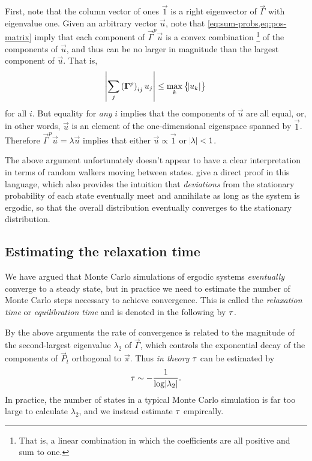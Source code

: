 First, note that the column vector of ones $\vec{1}$ is a right eigenvector of
$\vec{\Gamma}$ with eigenvalue one. Given an arbitrary vector $\vec{u}$, note
that \cref{eq:sum-probs,eq:pos-matrix} imply that each component of
$\vec{\Gamma}^p \vec{u}$ is a convex combination%
\footnote{%
  That is, a linear combination in which the coefficients are all positive and
  sum to one.
}
of the components of $\vec{u}$, and thus can be no larger in magnitude than the
largest component of $\vec{u}$. That is,
\begin{equation}
  \abs{\sum_j \del{\vec{\Gamma}^p}_{ij} u_j}
  \leq \max_k \cbr{\abs{u_k}}
\end{equation}
for all $i$. But equality for \emph{any} $i$ implies that the components of
$\vec{u}$ are all equal, or, in other words, $\vec{u}$ is an element of the
one-dimensional eigenspace spanned by $\vec{1}$. Therefore
$\vec{\Gamma}^p \vec{u} = \lambda\vec{u}$ implies that either $\vec{u} \propto \vec{1}$
or $\abs{\lambda}<1$.

The above argument unfortunately doesn't appear to have a clear interpretation
in terms of random walkers moving between states.
\textcite{narayan2001convergence} give a direct proof in this language, which
also provides the intuition that \emph{deviations} from the stationary
probability of each state eventually meet and annihilate as long as the system
is ergodic, so that the overall distribution eventually converges to the
stationary distribution.

\subsection{Estimating the relaxation time}
\label{sec:numerical-equilibration}

We have argued that Monte Carlo simulations of ergodic systems
\emph{eventually} converge to a steady state, but in practice we need to
estimate the number of Monte Carlo steps necessary to achieve convergence. This
is called the \emph{relaxation time} or \emph{equilibration time} and is
denoted in the following by $\tau$.

By the above arguments the rate of convergence is related to the magnitude of
the second-largest eigenvalue $\lambda_2$ of $\vec{\Gamma}$, which controls the
exponential decay of the components of $\vec{P}_t$ orthogonal to $\vec{\pi}$.
Thus \emph{in theory} $\tau$ can be estimated by
\begin{equation}
  \tau \sim -\frac{1}{\log{\abs{\lambda_2}}}.
\end{equation}
In practice, the number of states in a typical Monte Carlo simulation is far
too large to calculate $\lambda_2$, and we instead estimate $\tau$ empircally.

